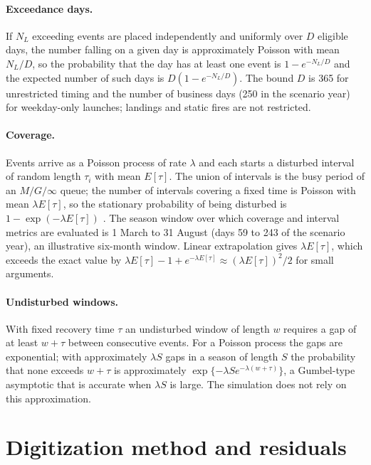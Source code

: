 \documentclass[11pt]{article}
\begin{document}
\paragraph{Exceedance days.} If $N_L$ exceeding events are placed independently and uniformly over $D$ eligible days, the number falling on a given day is approximately Poisson with mean $N_L/D$, so the probability that the day has at least one event is $1 - e^{-N_L/D}$ and the expected number of such days is $D(1 - e^{-N_L/D})$. The bound $D$ is 365 for unrestricted timing and the number of business days (\num{250} in the scenario year) for weekday-only launches; landings and static fires are not restricted.

\paragraph{Coverage.} Events arrive as a Poisson process of rate $\lambda$ and each starts a disturbed interval of random length $\tau_i$ with mean $E[\tau]$. The union of intervals is the busy period of an $M/G/\infty$ queue; the number of intervals covering a fixed time is Poisson with mean $\lambda E[\tau]$, so the stationary probability of being disturbed is $1 - \exp(-\lambda E[\tau])$ \citep{daley2003,hall1988}. The season window over which coverage and interval metrics are evaluated is 1 March to 31 August (days 59 to 243 of the scenario year), an illustrative six-month window. Linear extrapolation gives $\lambda E[\tau]$, which exceeds the exact value by $\lambda E[\tau] - 1 + e^{-\lambda E[\tau]} \approx (\lambda E[\tau])^2/2$ for small arguments.

\paragraph{Undisturbed windows.} With fixed recovery time $\tau$ an undisturbed window of length $w$ requires a gap of at least $w + \tau$ between consecutive events. For a Poisson process the gaps are exponential; with approximately $\lambda S$ gaps in a season of length $S$ the probability that none exceeds $w + \tau$ is approximately $\exp\{-\lambda S e^{-\lambda(w+\tau)}\}$, a Gumbel-type asymptotic that is accurate when $\lambda S$ is large. The simulation does not rely on this approximation.

\section{Digitization method and residuals}
\end{document}
